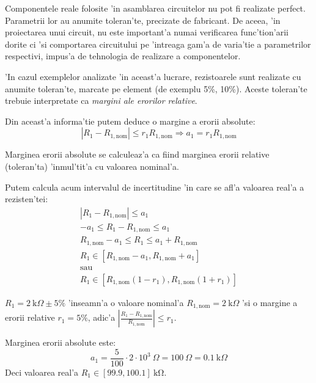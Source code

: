 Componentele reale folosite 'in asamblarea circuitelor nu pot fi realizate perfect. Parametrii lor au anumite toleran'te, precizate de fabricant. De aceea, 'in proiectarea unui circuit, nu este important'a numai verificarea func'tion'arii dorite ci 'si comportarea circuitului pe 'intreaga gam'a de varia'tie a parametrilor respectivi, impus'a de tehnologia de realizare a componentelor.

'In cazul exemplelor analizate 'in aceast'a lucrare, rezistoarele sunt realizate cu anumite toleran'te, marcate pe element (de exemplu 5\%, 10\%). Aceste toleran'te trebuie interpretate ca \textit{margini ale erorilor relative}.

Din aceast'a informa'tie putem deduce o margine a erorii absolute:
\begin{equation*}
\left|R_1-R_{1,\mathrm{nom}}\right| \leq r_1R_{1,\mathrm{nom}} \Longrightarrow a_1 = r_1R_{1,\mathrm{nom}}
\end{equation*}

\begin{retine}
  \label{retine3}
  \index{}
    Marginea erorii absolute se calculeaz'a ca fiind marginea erorii relative (toleran'ta) 'inmul'tit'a cu valoarea nominal'a. 
\end{retine}

Putem calcula acum intervalul de incertitudine 'in care se afl'a valoarea real'a a rezisten'tei:
\begin{align*}
\left|R_1-R_{1,\mathrm{nom}}\right| \leq a_1 \\
-a_1 \leq R_1 - R_{1,\mathrm{nom}} \leq a_1 \\
R_{1,\mathrm{nom}} - a_1 \leq R_1 \leq a_1 + R_{1,\mathrm{nom}} \\
R_1 \in [R_{1,\mathrm{nom}}-a_1, R_{1,\mathrm{nom}} + a_1] \\
\text{sau} \\
R_1 \in [R_{1,\mathrm{nom}}(1-r_1), R_{1,\mathrm{nom}}(1+r_1)]
\end{align*}

\begin{example}[]
  $R_1 = 2~\mathrm{k}\Omega \pm 5\%$ 'inseamn'a o valoare nominal'a $R_{1,\mathrm{nom}}=2~\mathrm{k}\Omega$ 'si o margine a erorii relative $r_1=5\%$, adic'a $\left|\frac{R_1-R_{1,\mathrm{nom}}}{R_{1,\mathrm{nom}}}\right| \leq r_1$.
 
  Marginea erorii absolute este:
   \begin{equation*}
    	a_1 = \frac{5}{100}\cdot 2 \cdot 10^3~\Omega = 100~\Omega = 0.1~\mathrm{k}\Omega
  \end{equation*}
  Deci valoarea real'a $R_1 \in [99.9, 100.1]~\mathrm{k\Omega}$.
\end{example}

